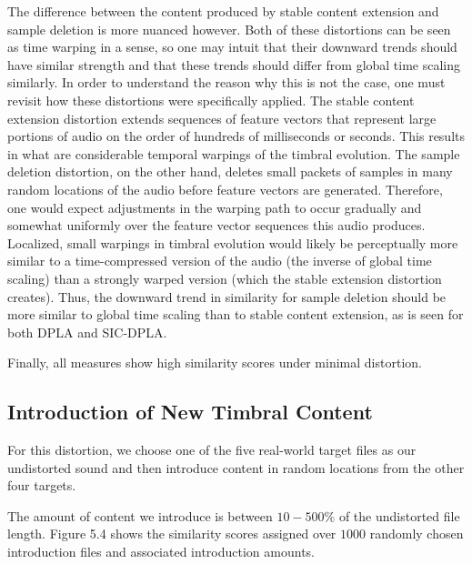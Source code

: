 \documentclass[12pt]{report} 	%
\numberwithin{figure}{chapter}
\numberwithin{table}{chapter}
\numberwithin{equation}{chapter}
\begin{document}
\begin{flushleft}
The difference between the content produced by stable content extension and sample deletion is more nuanced however. Both of these distortions can be seen as time warping in a sense, so one may intuit that their downward trends should have similar strength and that these trends should differ from global time scaling similarly. In order to understand the reason why this is not the case, one must revisit how these distortions were specifically applied. The stable content extension distortion extends sequences of feature vectors that represent large portions of audio on the order of hundreds of milliseconds or seconds. This results in what are considerable temporal warpings of the timbral evolution. The sample deletion distortion, on the other hand, deletes small packets of samples in many random locations of the audio before feature vectors are generated. Therefore, one would expect adjustments in the warping path to occur gradually and somewhat uniformly over the feature vector sequences this audio produces. Localized, small warpings in timbral evolution would likely be perceptually more similar to a time-compressed version of the audio (the inverse of global time scaling) than a strongly warped version (which the stable extension distortion creates). Thus, the downward trend in similarity for sample deletion should be more similar to global time scaling than to stable content extension, as is seen for both DPLA and SIC-DPLA.

Finally, all measures show high similarity scores under minimal distortion.

\subsection{Introduction of New Timbral Content}
For this distortion, we choose one of the five real-world target files as our undistorted sound and then introduce content in random locations from the other four targets. 

The amount of content we introduce is between $10-500\%$ of the undistorted file length. Figure 5.4 shows the similarity scores assigned over $1000$ randomly chosen introduction files and associated introduction amounts.


\end{flushleft}
\end{document}
